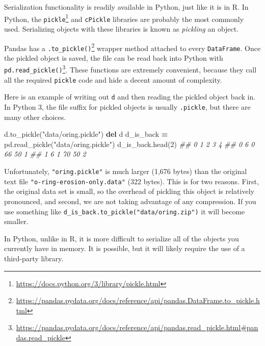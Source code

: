 \documentclass[
  12pt,
  krantz2]{krantz}
\makeatletter
\newenvironment{Shaded}{\begin{snugshade}}{\end{snugshade}}
\newcommand{\CommentTok}[1]{\textcolor[rgb]{0.37,0.37,0.37}{\textit{#1}}}
\newcommand{\DecValTok}[1]{\textcolor[rgb]{0.06,0.06,0.06}{#1}}
\newcommand{\KeywordTok}[1]{\textcolor[rgb]{0.27,0.27,0.27}{\textbf{#1}}}
\newcommand{\NormalTok}[1]{#1}
\newcommand{\OperatorTok}[1]{\textcolor[rgb]{0.43,0.43,0.43}{\textbf{#1}}}
\newcommand{\StringTok}[1]{\textcolor[rgb]{0.5,0.5,0.5}{#1}}
\renewcommand{\href}[2]{#2\footnote{\url{#1}}}
\newenvironment{kframe}{%
\medskip{}
\setlength{\fboxsep}{.8em}
 \def\at@end@of@kframe{}%
 \ifinner\ifhmode%
  \def\at@end@of@kframe{\end{minipage}}%
  \begin{minipage}{\columnwidth}%
 \fi\fi%
 \def\FrameCommand##1{\hskip\@totalleftmargin \hskip-\fboxsep
 \colorbox{shadecolor}{##1}\hskip-\fboxsep
     \hskip-\linewidth \hskip-\@totalleftmargin \hskip\columnwidth}%
 \MakeFramed {\advance\hsize-\width
   \@totalleftmargin\z@ \linewidth\hsize
   \@setminipage}}%
 {\par\unskip\endMakeFramed%
 \at@end@of@kframe}
\renewenvironment{Shaded}{\begin{kframe}}{\end{kframe}}
\makeatother
\begin{document}
Serialization functionality is readily available in Python, just like it is in R. In Python, the \href{https://docs.python.org/3/library/pickle.html}{\texttt{pickle}} and \texttt{cPickle} libraries are probably the most commonly used. Serializing objects with these libraries is known as \emph{pickling} an object.

Pandas has a \href{https://pandas.pydata.org/docs/reference/api/pandas.DataFrame.to_pickle.html}{\texttt{.to\_pickle()}} wrapper method attached to every \texttt{DataFrame}. Once the pickled object is saved, the file can be read back into Python with \href{https://pandas.pydata.org/docs/reference/api/pandas.read_pickle.html\#pandas.read_pickle}{\texttt{pd.read\_pickle()}}. These functions are extremely convenient, because they call all the required \texttt{pickle} code and hide a decent amount of complexity.

Here is an example of writing out \texttt{d} and then reading the pickled object back in. In Python 3, the file suffix for pickled objects is usually \texttt{.pickle}, but there are many other choices.

\begin{Shaded}
\begin{Highlighting}[]
\NormalTok{d.to\_pickle(}\StringTok{"data/oring.pickle"}\NormalTok{)}
\KeywordTok{del}\NormalTok{ d}
\NormalTok{d\_is\_back }\OperatorTok{=}\NormalTok{ pd.read\_pickle(}\StringTok{"data/oring.pickle"}\NormalTok{)}
\NormalTok{d\_is\_back.head(}\DecValTok{2}\NormalTok{)}
\CommentTok{\#\#    0  1   2   3  4}
\CommentTok{\#\# 0  6  0  66  50  1}
\CommentTok{\#\# 1  6  1  70  50  2}
\end{Highlighting}
\end{Shaded}

\begin{rmd-caution}
Unfortunately, \texttt{"oring.pickle"} is much larger (1,676 bytes) than the original text file \texttt{"o-ring-erosion-only.data"} (322 bytes). This is for two reasons. First, the original data set is small, so the overhead of pickling this object is relatively pronounced, and second, we are not taking advantage of any compression. If you use something like \texttt{d\_is\_back.to\_pickle("data/oring.zip")} it will become smaller.

\end{rmd-caution}

In Python, unlike in R, it is more difficult to serialize all of the objects you currently have in memory. It is possible, but it will likely require the use of a third-party library.
\end{document}
